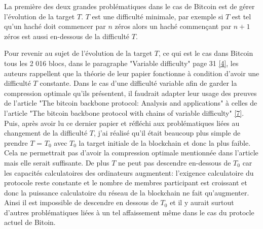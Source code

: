 \documentclass[12pt,a4paper]{article}
\newcommand{\source}[1]{\hyperlink{#1}{[#1]}}
\begin{document}
	La première des deux grandes problématiques dans le cas de Bitcoin est de gérer l'évolution de la target $T$. $T$ est une difficulté minimale, par exemple si $T$ est tel qu'un haché doit commencer par $n$ zéros alors un haché commençant par $n + 1$ zéros est aussi en-dessous de la difficulté $T$. %
	
	Pour revenir au sujet de l'évolution de la target $T$, ce qui est le cas dans Bitcoin tous les 2 016 blocs, dans le paragraphe "Variable difficulty" page 31 \source{4}, les auteurs rappellent que la théorie de leur papier fonctionne à condition d'avoir une difficulté $T$ constante. Dans le cas d'une difficulté variable afin de garder la compression optimale qu'ils présentent, il faudrait adapter leur usage des preuves de l'article "The bitcoin backbone protocol: Analysis and applications" à celles de l'article "The bitcoin backbone protocol with chains of variable difficulty" \source{7}.\\ %
	Puis, après avoir lu ce dernier papier et réfléchi aux problématiques liées au changement de la difficulté $T$, j'ai réalisé qu'il était beaucoup plus simple de prendre $T$ = $T_0$ avec $T_0$ la target initiale de la blockchain et donc la plus faible. Cela ne permettrait pas d'avoir la compression optimale mentionnée dans l'article mais elle serait suffisante. De plus $T$ ne peut pas descendre en-dessous de $T_0$ car les capacités calculatoires des ordinateurs augmentent: l'exigence calculatoire du protocole reste constante et le nombre de membres participant est croissant et donc la puissance calculatoire du réseau de la blockchain ne fait qu'augmenter. Ainsi il est impossible de descendre en dessous de $T_0$ et il y aurait surtout d'autres problématiques liées à un tel affaissement même dans le cas du protocle actuel de Bitoin.\\ %
	
\end{document}
